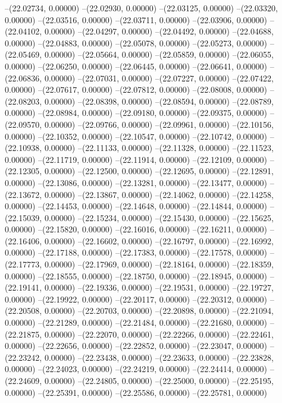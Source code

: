 --(22.02734, 0.00000)
--(22.02930, 0.00000)
--(22.03125, 0.00000)
--(22.03320, 0.00000)
--(22.03516, 0.00000)
--(22.03711, 0.00000)
--(22.03906, 0.00000)
--(22.04102, 0.00000)
--(22.04297, 0.00000)
--(22.04492, 0.00000)
--(22.04688, 0.00000)
--(22.04883, 0.00000)
--(22.05078, 0.00000)
--(22.05273, 0.00000)
--(22.05469, 0.00000)
--(22.05664, 0.00000)
--(22.05859, 0.00000)
--(22.06055, 0.00000)
--(22.06250, 0.00000)
--(22.06445, 0.00000)
--(22.06641, 0.00000)
--(22.06836, 0.00000)
--(22.07031, 0.00000)
--(22.07227, 0.00000)
--(22.07422, 0.00000)
--(22.07617, 0.00000)
--(22.07812, 0.00000)
--(22.08008, 0.00000)
--(22.08203, 0.00000)
--(22.08398, 0.00000)
--(22.08594, 0.00000)
--(22.08789, 0.00000)
--(22.08984, 0.00000)
--(22.09180, 0.00000)
--(22.09375, 0.00000)
--(22.09570, 0.00000)
--(22.09766, 0.00000)
--(22.09961, 0.00000)
--(22.10156, 0.00000)
--(22.10352, 0.00000)
--(22.10547, 0.00000)
--(22.10742, 0.00000)
--(22.10938, 0.00000)
--(22.11133, 0.00000)
--(22.11328, 0.00000)
--(22.11523, 0.00000)
--(22.11719, 0.00000)
--(22.11914, 0.00000)
--(22.12109, 0.00000)
--(22.12305, 0.00000)
--(22.12500, 0.00000)
--(22.12695, 0.00000)
--(22.12891, 0.00000)
--(22.13086, 0.00000)
--(22.13281, 0.00000)
--(22.13477, 0.00000)
--(22.13672, 0.00000)
--(22.13867, 0.00000)
--(22.14062, 0.00000)
--(22.14258, 0.00000)
--(22.14453, 0.00000)
--(22.14648, 0.00000)
--(22.14844, 0.00000)
--(22.15039, 0.00000)
--(22.15234, 0.00000)
--(22.15430, 0.00000)
--(22.15625, 0.00000)
--(22.15820, 0.00000)
--(22.16016, 0.00000)
--(22.16211, 0.00000)
--(22.16406, 0.00000)
--(22.16602, 0.00000)
--(22.16797, 0.00000)
--(22.16992, 0.00000)
--(22.17188, 0.00000)
--(22.17383, 0.00000)
--(22.17578, 0.00000)
--(22.17773, 0.00000)
--(22.17969, 0.00000)
--(22.18164, 0.00000)
--(22.18359, 0.00000)
--(22.18555, 0.00000)
--(22.18750, 0.00000)
--(22.18945, 0.00000)
--(22.19141, 0.00000)
--(22.19336, 0.00000)
--(22.19531, 0.00000)
--(22.19727, 0.00000)
--(22.19922, 0.00000)
--(22.20117, 0.00000)
--(22.20312, 0.00000)
--(22.20508, 0.00000)
--(22.20703, 0.00000)
--(22.20898, 0.00000)
--(22.21094, 0.00000)
--(22.21289, 0.00000)
--(22.21484, 0.00000)
--(22.21680, 0.00000)
--(22.21875, 0.00000)
--(22.22070, 0.00000)
--(22.22266, 0.00000)
--(22.22461, 0.00000)
--(22.22656, 0.00000)
--(22.22852, 0.00000)
--(22.23047, 0.00000)
--(22.23242, 0.00000)
--(22.23438, 0.00000)
--(22.23633, 0.00000)
--(22.23828, 0.00000)
--(22.24023, 0.00000)
--(22.24219, 0.00000)
--(22.24414, 0.00000)
--(22.24609, 0.00000)
--(22.24805, 0.00000)
--(22.25000, 0.00000)
--(22.25195, 0.00000)
--(22.25391, 0.00000)
--(22.25586, 0.00000)
--(22.25781, 0.00000)

